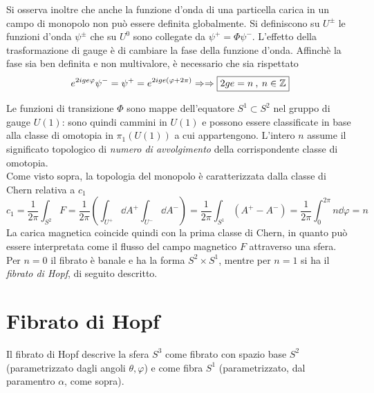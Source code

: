 Si osserva inoltre che anche la funzione d'onda di una particella carica in un
campo di monopolo non può essere definita globalmente.
Si definiscono su $U^\pm$ le funzioni d'onda $\psi^\pm$ che su $U^0$ sono collegate
da $\psi^+ = \Phi  \psi^-$. L'effetto della trasformazione di gauge è di cambiare la fase
della funzione d'onda. Affinchè la fase sia ben definita e non multivalore, è necessario
che sia rispettato
$$
   e^{2ige \varphi} \psi ^- = \psi ^+ =  e^{2ige (\varphi + 2\pi)} \Rightarrow
   \Rightarrow
   \boxed{
   2ge = n \:,\: n \in \mathbb{Z}
   }
$$

Le funzioni di transizione $\Phi$ sono mappe dell'equatore $S^1 \subset S^2$ nel gruppo
di gauge $U(1)$: sono quindi cammini in $U(1)$ e possono essere
classificate in base alla classe di omotopia in $\pi_1(U(1))$ a cui appartengono.
L'intero $n$ assume il significato topologico di \emph{numero di avvolgimento}
della corrispondente classe di omotopia.\\

Come visto sopra, la topologia del monopolo è caratterizzata dalla classe di Chern
relativa a $c_1$
\begin{equation*}
      c_1   = \frac{1}{2\pi} \int_{S^2} F
            = \frac{1}{2\pi} \left( \int_{U^+} \dd A^+ \int_{U^-} \dd A^- \right)
            = \frac{1}{2\pi} \int_{S^1} (A^+-A^-)
            = \frac{1}{2\pi} \int_0^{2\pi} n\dd \varphi   = n
\end{equation*}
La carica magnetica coincide quindi con la prima classe di Chern, in quanto
può essere interpretata come il flusso del campo magnetico $F$ attraverso una sfera.\\
Per $n=0$ il fibrato è banale e ha la forma $S^2 \times S^1$, mentre per $n=1$ si ha il
\emph{fibrato di Hopf}, di seguito descritto.

\section{Fibrato di Hopf}
Il fibrato di Hopf descrive la sfera $S^3$ come fibrato con spazio
base $S^2$ (parametrizzato dagli angoli $\theta,\varphi $) e come fibra $S^1$ (parametrizzato,
dal paramentro $\alpha$, come sopra).\\

